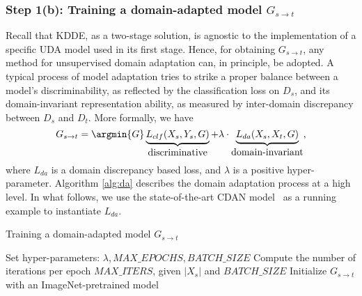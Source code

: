 \subsubsection{Step 1(b): Training a domain-adapted model $G_{s\rightarrow t}$}





Recall that KDDE, as a two-stage solution, is agnostic to the implementation of a specific UDA model used in its first stage.
Hence, for obtaining $G_{s\rightarrow t}$, any method for unsupervised domain adaptation can, in principle, be adopted. 
A typical process of model adaptation tries to strike a proper balance between a model's discriminability, as reflected by the classification loss on $D_s$, and its domain-invariant representation ability, as measured by inter-domain discrepancy between $D_s$ and $D_t$. More formally, we have 
\begin{equation}\label{eq:general-da}
G_{s\rightarrow t} = \argmin{G} \underbrace{L_{clf}(X_s, Y_s, G)}_{\mbox{discriminative}} + \lambda \cdot \underbrace{L_{da}(X_s, X_t, G)}_{\mbox{domain-invariant}},
\end{equation}
where $L_{da}$ is a domain discrepancy based loss, and $\lambda$ is a positive hyper-parameter. Algorithm \ref{alg:da} describes the domain adaptation process at a high level. In what follows, we use the state-of-the-art CDAN model~\cite{nips18-cdan} as a running example to instantiate $L_{da}$. 

\begin{algorithm}
\caption{Training a domain-adapted model $G_{s\rightarrow t}$}
\label{alg:da}
Set hyper-parameters: $\lambda, MAX\_EPOCHS, BATCH\_SIZE$\;
Compute the number of iterations per epoch $MAX\_ITERS$, given $|X_s|$ and  $BATCH\_SIZE$\;
Initialize {$G_{s\rightarrow t}$} with an ImageNet-pretrained model\;
\end{algorithm}
 





